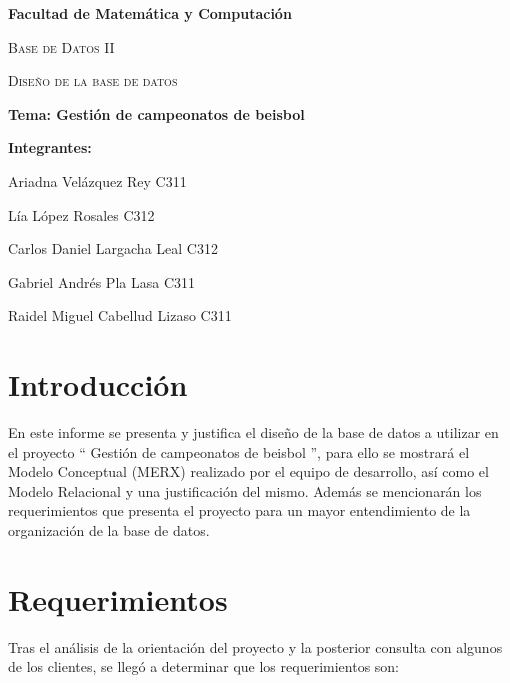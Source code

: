 \documentclass{report}
\begin{document}
    \begin{titlepage}
        \centering
        {\bfseries\LARGE Facultad de Matemática y Computación \par}
        \vspace*{1cm}
        {\scshape\Large Base de Datos II \par}
        \vspace*{3cm}
        {\scshape\Huge Diseño de la base de datos \par}
        \vspace*{1cm}
        {\LARGE \textbf{Tema: Gestión de campeonatos de beisbol} }
        \vfill
        {\bfseries\LARGE Integrantes: \par}
        {\Large Ariadna Vel\'azquez Rey  C311 \par} 
        {\Large L\'ia L\'opez Rosales  C312 \par} 
        {\Large Carlos Daniel Largacha Leal  C312 \par} 
        {\Large Gabriel Andr\'es Pla Lasa  C311 \par} 
        {\Large Raidel Miguel Cabellud Lizaso C311 \par} 
        \vfill
    \end{titlepage}


    \section*{Introducción}

    En este informe se presenta y justifica el diseño de la base de datos a utilizar en el proyecto `` Gestión de 
    campeonatos de beisbol '', para ello se mostrará el Modelo Conceptual (MERX) realizado por el equipo de 
    desarrollo, así como el Modelo Relacional y una justificación del mismo. Además se mencionarán los 
    requerimientos que presenta el proyecto para un mayor entendimiento de la organización de la base de datos.

    \section*{Requerimientos}
    Tras el análisis de la orientación del proyecto y la posterior consulta con algunos de los clientes, se llegó
    a determinar que los requerimientos son:
\end{document}
